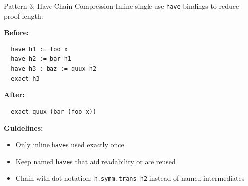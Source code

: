 \documentclass[aspectratio=169,10pt]{beamer}
\begin{document}
\begin{frame}[fragile]{Pattern 3: Have-Chain Compression}
    \vspace{-0.3em}
    Inline single-use \texttt{have} bindings to reduce proof length.

    \vspace{0.3em}
    \textbf{\textcolor{softred}{Before:}}
    \begin{lstlisting}
  have h1 := foo x
  have h2 := bar h1
  have h3 : baz := quux h2
  exact h3
    \end{lstlisting}

    \textbf{\textcolor{leangreen}{After:}}
    \begin{lstlisting}
  exact quux (bar (foo x))
    \end{lstlisting}

    \vspace{0.3em}
    {\small
    \textbf{Guidelines:}
    \begin{itemize}\itemsep0.1em
        \item Only inline \texttt{have}s used exactly once
        \item Keep named \texttt{have}s that aid readability or are reused
        \item Chain with dot notation: \texttt{h.symm.trans h2} instead of named intermediates
    \end{itemize}
    }
\end{frame}
\end{document}
